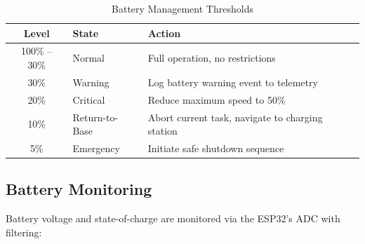 \begin{table}[H]
\centering
\caption{Battery Management Thresholds}
\begin{tabular}{|c|l|l|}
\hline
\textbf{Level} & \textbf{State} & \textbf{Action} \\
\hline
100\% -- 30\% & Normal & Full operation, no restrictions \\
\hline
30\% & Warning & Log battery warning event to telemetry \\
\hline
20\% & Critical & Reduce maximum speed to 50\% \\
\hline
10\% & Return-to-Base & Abort current task, navigate to charging station \\
\hline
5\% & Emergency & Initiate safe shutdown sequence \\
\hline
\end{tabular}
\end{table}

\subsection{Battery Monitoring}

Battery voltage and state-of-charge are monitored via the ESP32's ADC with filtering:

